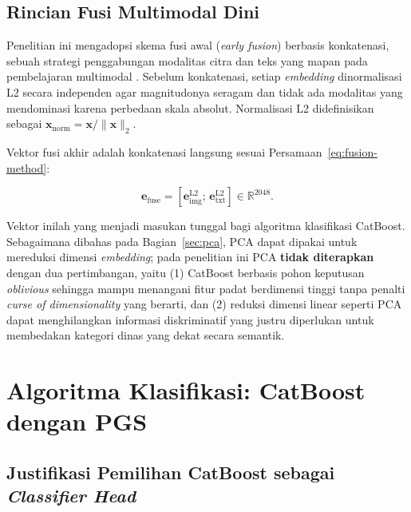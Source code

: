 \subsection{Rincian Fusi Multimodal Dini}
\label{sec:fusion-detail}

Penelitian ini mengadopsi skema fusi awal (\textit{early fusion}) berbasis konkatenasi, sebuah strategi penggabungan modalitas citra dan teks yang mapan pada pembelajaran multimodal \citep{baltrusaitisMultimodalSurvey2019,audebertMultimodalDoc2019}. Sebelum konkatenasi, setiap \textit{embedding} dinormalisasi L2 secara independen agar magnitudonya seragam dan tidak ada modalitas yang mendominasi karena perbedaan skala absolut. Normalisasi L2 didefinisikan sebagai $\mathbf{x}_{\text{norm}} = \mathbf{x} / \|\mathbf{x}\|_2$.

Vektor fusi akhir adalah konkatenasi langsung sesuai Persamaan~\ref{eq:fusion-method}:

\begin{equation}
    \mathbf{e}_{\text{fuse}} = [\mathbf{e}_{\text{img}}^{\text{L2}};\, \mathbf{e}_{\text{txt}}^{\text{L2}}] \in \mathbb{R}^{2048}.
    \label{eq:fusion-method}
\end{equation}

Vektor inilah yang menjadi masukan tunggal bagi algoritma klasifikasi CatBoost. Sebagaimana dibahas pada Bagian~\ref{sec:pca}, PCA dapat dipakai untuk mereduksi dimensi \textit{embedding}; pada penelitian ini PCA \textbf{tidak diterapkan} dengan dua pertimbangan, yaitu (1) CatBoost berbasis pohon keputusan \textit{oblivious} sehingga mampu menangani fitur padat berdimensi tinggi tanpa penalti \textit{curse of dimensionality} yang berarti, dan (2) reduksi dimensi linear seperti PCA dapat menghilangkan informasi diskriminatif yang justru diperlukan untuk membedakan kategori dinas yang dekat secara semantik.

\section{Algoritma Klasifikasi: CatBoost dengan PGS}
\label{sec:catboost}

\subsection{Justifikasi Pemilihan CatBoost sebagai \textit{Classifier Head}}
\label{sec:justifikasi-catboost}

